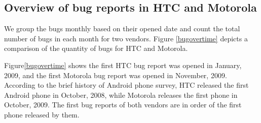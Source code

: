 \documentclass[10pt, conference, compsocconf]{IEEEtran}
\begin{document}
%
%
%

\subsection{Overview of bug reports in HTC and Motorola}

We group the bugs monthly based on their opened date and count the total number of bugs in each month for two vendors. Figure \ref{bugovertime} depicts a comparison of the quantity of bugs for HTC and Motorola.

Figure\ref{bugovertime} shows the first HTC bug report was opened in January, 2009, and the first Motorola bug report was opened in November, 2009. According to the brief history of Android phone survey\cite{historyofandroid}, HTC released the first Android phone in October, 2008, while Motorola releases the first phone in October, 2009. The first bug reports of both vendors are in order of the first phone released by them. 
\end{document}
